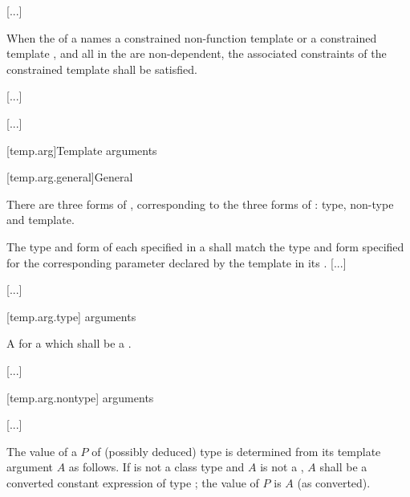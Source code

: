 \documentclass{wg21}
\begin{document}

\textcolor{noteclr}{[...]}

\pnum
When the 
of a 
names a constrained non-function template
or
a constrained template ,
and
all 
in the 
are non-dependent,
the associated constraints
of the constrained template
shall be satisfied.
\begin{example} \textcolor{noteclr}{[...]} \end{example}

\textcolor{noteclr}{[...]}


[temp.arg]{Template arguments}

[temp.arg.general]{General}


\begin{removedblock}
\pnum
{}%
There are three forms of
,
corresponding to the three forms of
:
type, non-type and template.
\end{removedblock}

The type and form of each
specified in a
shall match the type and form specified for the corresponding
parameter declared by the template in its
.
\textcolor{noteclr}{[...]}

\textcolor{noteclr}{[...]}

[temp.arg.type]{ arguments}

\pnum
A  for a  which  shall be a .

\textcolor{noteclr}{[...]}

[temp.arg.nontype]{ arguments}

\textcolor{noteclr}{[...]}

\pnum
The value of a  $P$
of (possibly deduced) type 
is determined from its template argument $A$ as follows.
If  is not a class type and
$A$ is not a ,
$A$ shall be a converted constant expression 
of type ; the value of $P$ is $A$ (as converted).
\end{document}
